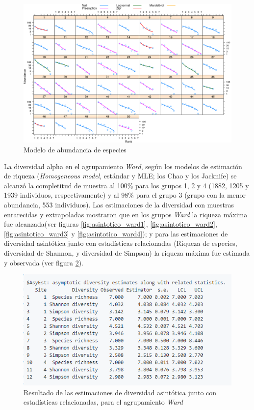 \documentclass[11pt,]{article}
\begin{document}
\begin{figure}
\centering
\includegraphics{modelodeabundancia.png}
\caption{Modelo de abundancia de especies \label{fig:modelo_abundancia}}
\end{figure}

La diversidad alpha en el agrupamiento \emph{Ward}, según los modelos de
estimación de riqueza (\emph{Homogeneous model}, estándar y MLE; los
Chao y los Jacknife) se alcanzó la completitud de muestra al 100\% para
los grupos 1, 2 y 4 (1882, 1205 y 1939 individuos, respectivamente) y al
98\% para el grupo 3 (grupo con la menor abundancia, 553 individuos).
Las estimaciones de la diversidad con muestras enrarecidas y
extrapoladas mostraron que en los grupos \emph{Ward} la riqueza máxima
fue alcanzada(ver figuras \ref{fig:asintotico_ward1},
\ref{fig:asintotico_ward2}, \ref{fig:asintotico_ward3} y
\ref{fig:asintotico_ward4}); y para las estimaciones de diversidad
asintótica junto con estadísticas relacionadas (Riqueza de especies,
diversidad de Shannon, y diversidad de Simpson) la riqueza máxima fue
estimada y observada (ver figura \ref{fig:sintotico_ward}).

\begin{figure}
\centering
\includegraphics{sintotico_ward.png}
\caption{Resultado de las estimaciones de diversidad asintótica junto
con estadísticas relacionadas, para el agrupamiento \emph{Ward}
\label{fig:sintotico_ward}}
\end{figure}
\end{document}
